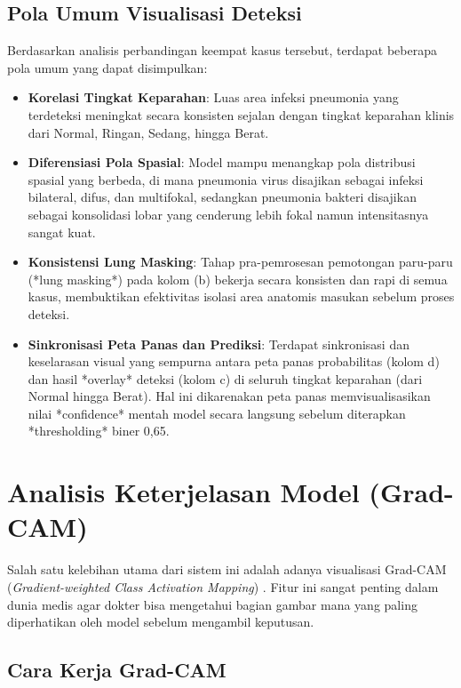 \documentclass[12pt,a4paper,oneside]{book}
\begin{document}
\subsection{Pola Umum Visualisasi Deteksi}

Berdasarkan analisis perbandingan keempat kasus tersebut, terdapat beberapa pola umum yang dapat disimpulkan:
\begin{itemize}
  \item \textbf{Korelasi Tingkat Keparahan}: Luas area infeksi pneumonia yang terdeteksi meningkat secara konsisten sejalan dengan tingkat keparahan klinis dari Normal, Ringan, Sedang, hingga Berat.
  \item \textbf{Diferensiasi Pola Spasial}: Model mampu menangkap pola distribusi spasial yang berbeda, di mana pneumonia virus disajikan sebagai infeksi bilateral, difus, dan multifokal, sedangkan pneumonia bakteri disajikan sebagai konsolidasi lobar yang cenderung lebih fokal namun intensitasnya sangat kuat.
  \item \textbf{Konsistensi Lung Masking}: Tahap pra-pemrosesan pemotongan paru-paru (*lung masking*) pada kolom (b) bekerja secara konsisten dan rapi di semua kasus, membuktikan efektivitas isolasi area anatomis masukan sebelum proses deteksi.
  \item \textbf{Sinkronisasi Peta Panas dan Prediksi}: Terdapat sinkronisasi dan keselarasan visual yang sempurna antara peta panas probabilitas (kolom d) dan hasil *overlay* deteksi (kolom c) di seluruh tingkat keparahan (dari Normal hingga Berat). Hal ini dikarenakan peta panas memvisualisasikan nilai *confidence* mentah model secara langsung sebelum diterapkan *thresholding* biner 0,65.
\end{itemize}

\section{Analisis Keterjelasan Model (Grad-CAM)}

Salah satu kelebihan utama dari sistem ini adalah adanya visualisasi Grad-CAM (\textit{Gradient-weighted Class Activation Mapping}) \parencite{selvaraju2017gradcam}. Fitur ini sangat penting dalam dunia medis agar dokter bisa mengetahui bagian gambar mana yang paling diperhatikan oleh model sebelum mengambil keputusan.

\subsection{Cara Kerja Grad-CAM}
\end{document}
